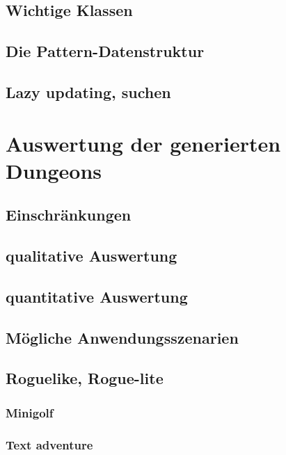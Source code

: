 \section{Wichtige Klassen}


\section{Die Pattern-Datenstruktur}

\section{Lazy updating, suchen}


\chapter{Auswertung der generierten Dungeons}

\section{Einschränkungen}


\section{qualitative Auswertung}

\section{quantitative Auswertung}

\section{Mögliche Anwendungsszenarien}

\section{Roguelike, Rogue-lite}

\subsection{Minigolf}

\subsection{Text adventure}


